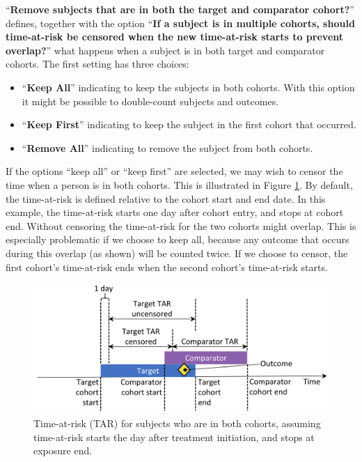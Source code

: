\documentclass[]{book}
\providecommand{\tightlist}{%
  \setlength{\itemsep}{0pt}\setlength{\parskip}{0pt}}
\begin{document}
``\textbf{Remove subjects that are in both the target and comparator cohort?}'' defines, together with the option ``\textbf{If a subject is in multiple cohorts, should time-at-risk be censored when the new time-at-risk starts to prevent overlap?}'' what happens when a subject is in both target and comparator cohorts. The first setting has three choices:

\begin{itemize}
\tightlist
\item
  ``\textbf{Keep All}'' indicating to keep the subjects in both cohorts. With this option it might be possible to double-count subjects and outcomes.
\item
  ``\textbf{Keep First}'' indicating to keep the subject in the first cohort that occurred.
\item
  ``\textbf{Remove All}'' indicating to remove the subject from both cohorts.
\end{itemize}

If the options ``keep all'' or ``keep first'' are selected, we may wish to censor the time when a person is in both cohorts. This is illustrated in Figure \ref{fig:tar}. By default, the time-at-risk is defined relative to the cohort start and end date. In this example, the time-at-risk starts one day after cohort entry, and stops at cohort end. Without censoring the time-at-risk for the two cohorts might overlap. This is especially problematic if we choose to keep all, because any outcome that occurs during this overlap (as shown) will be counted twice. If we choose to censor, the first cohort's time-at-risk ends when the second cohort's time-at-risk starts.

\begin{figure}

{\centering \includegraphics[width=0.8\linewidth]{images/PopulationLevelEstimation/tar} 

}

\caption{Time-at-risk (TAR) for subjects who are in both cohorts, assuming time-at-risk starts the day after treatment initiation, and stops at exposure end.}\label{fig:tar}
\end{figure}
\end{document}
